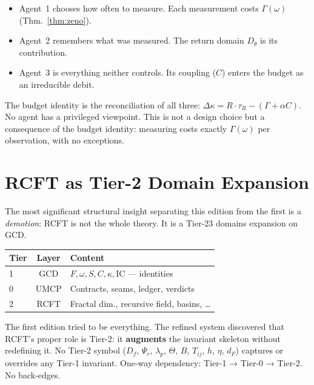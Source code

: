 \documentclass[
  aps,
  prd,
  preprint,
  superscriptaddress,
  nofootinbib,
  floatfix,
  longbibliography
]{revtex4-2}
\newcommand{\tR}{\tau_{\!R}}
\newcommand{\Gam}{\Gamma}
\newcommand{\IC}{\mathrm{IC}}
\newcommand{\Fid}{F}
\newcommand{\Drft}{\omega}
\newcommand{\Ent}{S}
\newcommand{\Curv}{C}
\newcommand{\Logint}{\kappa}
\newcommand{\Psirec}{\Psi_{r}}
\newcommand{\dFisher}{d_{\!F}}
\begin{document}
\begin{itemize}[nosep,leftmargin=*]
  \item Agent~1 chooses how often to measure.
    Each measurement costs $\Gam(\Drft)$ (Thm.~\ref{thm:zeno}).
  \item Agent~2 remembers what was measured.
    The return domain $D_\theta$ is its contribution.
  \item Agent~3 is everything neither controls.
    Its coupling ($\Curv$) enters the budget as an
    irreducible debit.
\end{itemize}

The budget identity is the reconciliation of all three:
$\Delta\Logint = R \cdot \tR - (\Gam + \alpha\Curv)$.
No agent has a privileged viewpoint.
This is not a design choice but a consequence of the
budget identity: measuring costs exactly $\Gam(\Drft)$
per observation, with no exceptions.

\section{RCFT as Tier-2 Domain Expansion}\label{sec:rcft}

The most significant structural insight
separating this edition from the first is a \emph{demotion}:
RCFT is not the whole theory. It is a Tier-23 domains
expansion on GCD.

\begin{center}
\begin{tabular}{@{}lcl@{}}
\toprule
\textbf{Tier} & \textbf{Layer} & \textbf{Content} \\
\midrule
1 & GCD & $\Fid, \Drft, \Ent, \Curv, \Logint, \IC$ — identities \\
0 & UMCP & Contracts, seams, ledger, verdicts \\
2 & RCFT & Fractal dim., recursive field, basins, \ldots \\
\bottomrule
\end{tabular}
\end{center}

The first edition tried to be everything.
The refined system discovered that RCFT's proper role
is Tier-2: it \textbf{augments} the invariant skeleton
without redefining it.
No Tier-2 symbol ($D_f$, $\Psirec$, $\lambda_p$,
$\Theta$, $B$, $T_{ij}$, $h$, $\eta$, $\dFisher$)
captures or overrides any Tier-1 invariant.
One-way dependency: Tier-1 → Tier-0 → Tier-2.
No back-edges.
\end{document}
